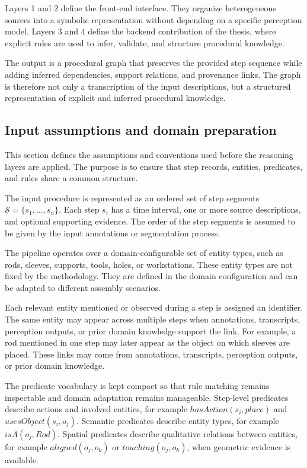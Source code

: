 Layers 1 and 2 define the front-end interface. They organize heterogeneous sources into a symbolic representation without depending on a specific perception model. Layers 3 and 4 define the backend contribution of the thesis, where explicit rules are used to infer, validate, and structure procedural knowledge.

The output is a procedural graph that preserves the provided step sequence while adding inferred dependencies, support relations, and provenance links. The graph is therefore not only a transcription of the input descriptions, but a structured representation of explicit and inferred procedural knowledge.


\subsection{Input assumptions and domain preparation}
\label{sec:input-assumptions}

This section defines the assumptions and conventions used before the reasoning layers are applied. The purpose is to ensure that step records, entities, predicates, and rules share a common structure.

The input procedure is represented as an ordered set of step segments $\mathcal{S} = \{s_1,\ldots,s_n\}$. Each step $s_i$ has a time interval, one or more source descriptions, and optional supporting evidence. The order of the step segments is assumed to be given by the input annotations or segmentation process.

The pipeline operates over a domain-configurable set of entity types, such as rods, sleeves, supports, tools, holes, or workstations. These entity types are not fixed by the methodology. They are defined in the domain configuration and can be adapted to different assembly scenarios.

Each relevant entity mentioned or observed during a step is assigned an identifier. The same entity may appear across multiple steps when annotations, transcripts, perception outputs, or prior domain knowledge support the link. For example, a rod mentioned in one step may later appear as the object on which sleeves are placed. These links may come from annotations, transcripts, perception outputs, or prior domain knowledge.

The predicate vocabulary is kept compact so that rule matching remains inspectable and domain adaptation remains manageable. Step-level predicates describe actions and involved entities, for example $hasAction(s_i,place)$ and $usesObject(s_i,o_j)$. Semantic predicates describe entity types, for example $isA(o_j,Rod)$. Spatial predicates describe qualitative relations between entities, for example $aligned(o_j,o_k)$ or $touching(o_j,o_k)$, when geometric evidence is available.

